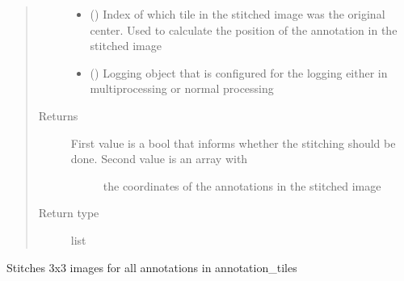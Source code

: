 \documentclass[letterpaper,10pt,english]{sphinxmanual}
\begin{document}
\begin{fulllineitems}
\begin{fulllineitems}
\begin{quote}
\begin{description}
\begin{itemize}
\item {} 
 () \textendash{} Index of which tile in the stitched image was the original center. Used to calculate
the position of the annotation in the stitched image

\item {} 
 () \textendash{} Logging object that is configured for the logging either in multiprocessing or normal
processing

\end{itemize}

\item[{Returns}] \leavevmode
\begin{description}
\item[{First value is a bool that informs whether the stitching should be done. Second value is an array with}] \leavevmode
the coordinates of the annotations in the stitched image

\end{description}


\item[{Return type}] \leavevmode
list

\end{description}\end{quote}

\end{fulllineitems}


\begin{fulllineitems}
\label{\detokenize{index:stitch_MAPS_annotations.Stitcher.stitch_annotated_tiles}}
Stitches 3x3 images for all annotations in annotation\_tiles


\end{fulllineitems}
\end{fulllineitems}
\end{document}
